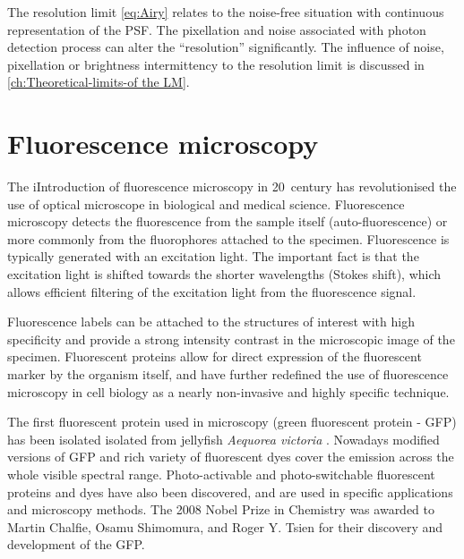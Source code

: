 The resolution limit \autoref{eq:Airy} relates to the noise-free situation with continuous representation of the PSF. The pixellation and noise associated with photon detection process can alter the ``resolution'' significantly. The influence of noise, pixellation or brightness intermittency to the resolution limit is discussed in \autoref{ch:Theoretical-limits-of the LM}. 




\section{Fluorescence microscopy\label{sec:Fluorescence microscopy}}

The iIntroduction of fluorescence microscopy in 20\ths\ century has revolutionised the use of optical microscope in biological and medical science. Fluorescence microscopy detects the fluorescence from the sample itself (auto-fluorescence) or more commonly from the fluorophores attached to the specimen. Fluorescence is typically generated with an excitation light. The important fact is that the excitation light is shifted towards the shorter wavelengths (Stokes shift),  which allows efficient filtering of the excitation light from the fluorescence signal. 

Fluorescence labels can be attached to the structures of interest with high specificity and provide a strong intensity contrast in the microscopic image of the specimen. Fluorescent proteins allow for direct expression of the fluorescent marker by the organism itself, and have further redefined the use of fluorescence microscopy in cell biology as a nearly non-invasive and highly specific technique. 

 The first fluorescent protein used in microscopy (green fluorescent protein - GFP) has been isolated isolated from jellyfish {\it Aequorea victoria} \cite{Tsien1998}. Nowadays modified versions of GFP and rich variety of fluorescent dyes cover the emission across the whole visible spectral range. Photo-activable and photo-switchable fluorescent proteins and dyes have also been discovered, and are used in specific applications and microscopy methods. The 2008 Nobel Prize in Chemistry was awarded to Martin Chalfie, Osamu Shimomura, and Roger Y. Tsien for their discovery and development of the GFP.
 
 

